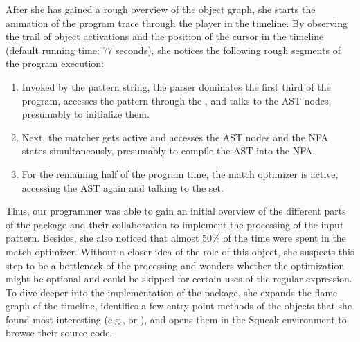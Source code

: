 After she has gained a rough overview of the object graph, she starts the animation of the program trace through the player in the timeline.
By observing the trail of object activations and the position of the cursor in the timeline (default running time: 77 seconds), she notices the following rough segments of the program execution:

\begin{enumerate}
	\item Invoked by the pattern string, the parser dominates the first third of the program, accesses the pattern through the , and talks to the AST nodes, presumably to initialize them.
	\item Next, the matcher gets active and accesses the AST nodes and the NFA states simultaneously, presumably to compile the AST into the NFA.
	\item For the remaining half of the program time, the match optimizer is active, accessing the AST again and talking to the set.
\end{enumerate}

Thus, our programmer was able to gain an initial overview of the different parts of the  package and their collaboration to implement the processing of the input pattern.
Besides, she also noticed that almost 50\si{\percent} of the time were spent in the match optimizer.
Without a closer idea of the role of this object, she suspects this step to be a bottleneck of the processing and wonders whether the optimization might be optional and could be skipped for certain uses of the regular expression.
To dive deeper into the implementation of the  package, she expands the flame graph of the timeline, identifies a few entry point methods of the objects that she found most interesting (e.g.,  or ), and opens them in the Squeak environment to browse their source code.

